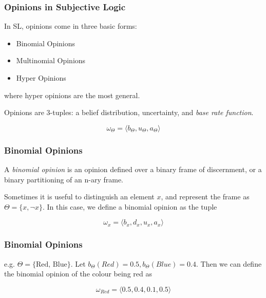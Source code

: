 \documentclass{beamer}
\begin{document}

\begin{frame}
\frametitle{Opinions in Subjective Logic}

In SL, opinions come in three basic forms:

\begin{itemize}
  \item Binomial Opinions
  \item Multinomial Opinions
  \item Hyper Opinions
\end{itemize}

where hyper opinions are the most general.

Opinions are 3-tuples: a belief distribution, uncertainty, and \emph{base rate function}.

$$
\omega_\Theta = \langle b_\Theta, u_\Theta, a_\Theta \rangle
$$

\end{frame}



\begin{frame}
\frametitle{Binomial Opinions}

A \emph{binomial opinion} is an opinion defined over a binary frame of discernment, or
a binary partitioning of an n-ary frame.

Sometimes it is useful to distinguish an element $x$, and represent the frame as
$\Theta = \lbrace x, \lnot x \rbrace$. In this case, we define a binomial opinion as
the tuple

$$
\omega_x = \langle b_x, d_x, u_x, a_x \rangle
$$

\end{frame}


\begin{frame}
\frametitle{Binomial Opinions}

e.g. $\Theta = \lbrace \mbox{Red, Blue} \rbrace$.
Let $b_\Theta\left(Red\right) = 0.5, b_\Theta\left(Blue\right) = 0.4$. Then we can
define the binomial opinion of the colour being red as

$$
\omega_{Red} = \langle 0.5, 0.4, 0.1, 0.5 \rangle
$$

\end{frame}
\end{document}
